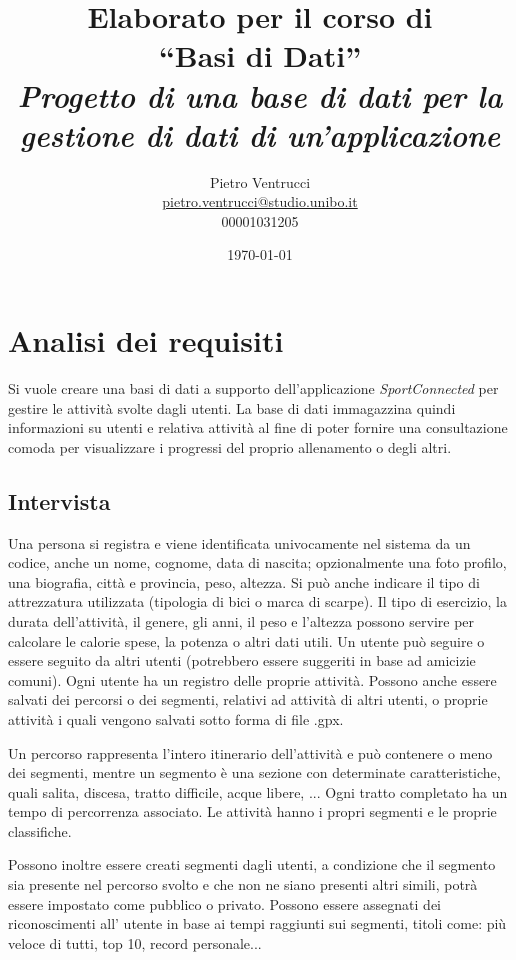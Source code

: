 \documentclass[12pt]{report}
\title{Elaborato per il corso di\\``Basi di Dati''\\[0.3in]
	\large \it Progetto di una base di dati per la gestione di dati di un'applicazione
}
\author{Pietro Ventrucci\\\href{mailto:pietro.ventrucci@studio.unibo.it}{pietro.ventrucci@studio.unibo.it}\\00001031205}
\date{\today}
\begin{document}
\maketitle

\tableofcontents

\chapter{Analisi dei requisiti}

Si vuole creare una basi di dati a supporto dell'applicazione \emph{SportConnected} per gestire le attività
svolte dagli utenti. La base di dati immagazzina quindi informazioni su utenti e relativa attività al fine
di poter fornire una consultazione comoda per visualizzare i progressi del proprio allenamento o degli altri.

\section{Intervista}
Una persona si registra e viene identificata univocamente nel sistema da un codice, anche un nome, cognome, 
data di nascita; opzionalmente una foto profilo, una biografia, città e provincia, peso, altezza. 
Si può anche indicare il tipo di attrezzatura utilizzata (tipologia di bici o marca di scarpe).
Il tipo di esercizio, la durata dell'attività, il genere, gli anni, il peso e l'altezza possono servire per
calcolare le calorie spese, la potenza o altri dati utili. Un utente può seguire o essere seguito da altri 
utenti (potrebbero essere suggeriti in base ad amicizie comuni). Ogni utente ha un registro delle proprie 
attività. Possono anche essere salvati dei percorsi o dei segmenti, relativi ad attività di altri utenti, 
o proprie attività i quali vengono salvati sotto forma di file .gpx.

Un percorso rappresenta l'intero itinerario dell'attività e può contenere o meno dei segmenti, mentre un 
segmento è una sezione con determinate caratteristiche, quali salita, discesa, tratto difficile, 
acque libere, ... Ogni tratto completato ha un tempo di percorrenza associato. Le attività hanno i 
propri segmenti e le proprie classifiche.

Possono inoltre essere creati segmenti dagli utenti, a condizione che 
il segmento sia presente nel percorso svolto e che non ne siano presenti altri simili, potrà essere 
impostato come pubblico o privato. Possono essere assegnati dei riconoscimenti all' utente in base ai 
tempi raggiunti sui segmenti, titoli come: più veloce di tutti, top 10, record personale...
\end{document}
